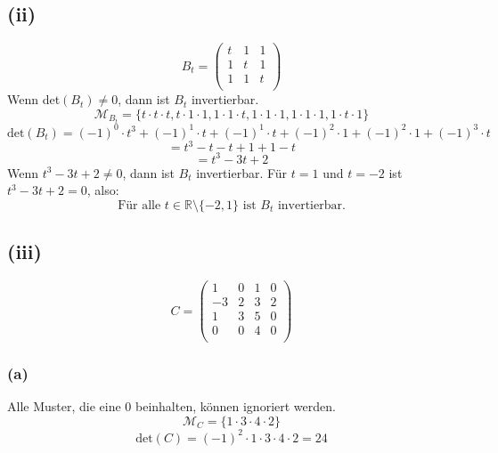 \documentclass{article}
\begin{document}
\subsection{(ii)}
\[B_t = \begin{pmatrix}
    t & 1 & 1 \\
    1 & t & 1 \\
    1 & 1 & t \\
\end{pmatrix}\]
Wenn det$(B_t) \neq 0$, dann ist $B_t$ invertierbar.
\[\mathcal{M}_{B_t} = \{ t \cdot t \cdot t, t \cdot 1 \cdot 1, 1 \cdot 1 \cdot t, 1 \cdot 1 \cdot 1, 1 \cdot 1 \cdot 1, 1 \cdot t \cdot 1 \}\]
\[\text{det}(B_t) = (-1)^0 \cdot t^3 + (-1)^1 \cdot t + (-1)^1 \cdot t + (-1)^2 \cdot 1 + (-1)^2 \cdot 1 + (-1)^3 \cdot t\]
\[= t^3 - t - t + 1 + 1 - t\]
\[= t^3 - 3t + 2\]
Wenn $t^3 - 3t + 2 \neq 0$, dann ist $B_t$ invertierbar.
Für $t = 1$ und $t = -2$ ist $t^3 - 3t + 2 = 0$, also:
\[\text{Für alle } t \in \mathbb{R} \setminus \{-2, 1\} \text{ ist $B_t$ invertierbar.}\]
\subsection{(iii)}
\[C = \begin{pmatrix}
    1 & 0 & 1 & 0 \\
    -3 & 2 & 3 & 2 \\
    1 & 3 & 5 & 0 \\
    0 & 0 & 4 & 0 \\
\end{pmatrix}\]
\subsubsection{(a)}
Alle Muster, die eine 0 beinhalten, können ignoriert werden.
\[\mathcal{M}_C = \{1 \cdot 3 \cdot 4 \cdot 2\}\]
\[\text{det}(C) = (-1)^2 \cdot 1 \cdot 3 \cdot 4 \cdot 2 = 24\]
\end{document}
